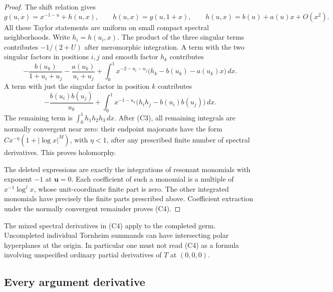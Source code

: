 \begin{proof}
The shift relation gives
\[
 g(u,x)=x^{-1-u}+h(u,x),\qquad h(u,x)=g(u,1+x),
 \qquad h(u,x)=b(u)+a(u)x+O(x^2).
\]
All these Taylor statements are uniform on small compact spectral
neighborhoods.  Write $h_i=h(u_i,x)$.  The product of the three singular
terms contributes $-1/(2+U)$ after meromorphic integration. A term with
the two singular factors in positions $i,j$ and smooth factor $h_k$
contributes
\[
 -\frac{b(u_k)}{1+u_i+u_j}-\frac{a(u_k)}{u_i+u_j}
 +\int_0^1x^{-2-u_i-u_j}
             \bigl(h_k-b(u_k)-a(u_k)x\bigr)\,dx.
\]
A term with just the singular factor in position $k$ contributes
\[
 -\frac{b(u_i)b(u_j)}{u_k}
 +\int_0^1x^{-1-u_k}\bigl(h_i h_j-b(u_i)b(u_j)\bigr)\,dx.
\]
The remaining term is $\int_0^1h_1h_2h_3\,dx$.
After (C3), all remaining integrals are normally convergent near zero:
their endpoint majorants have the form
$Cx^{-\eta}(1+|\log x|^M)$, with $\eta<1$, after any prescribed finite
number of spectral derivatives.  This proves holomorphy.

The deleted expressions are exactly the integrations of resonant
monomials with exponent $-1$ at $\boldsymbol u=0$. Each coefficient of
such a monomial is a multiple of $x^{-1}\log^j x$, whose unit-coordinate
finite part is zero. The other integrated monomials have precisely the
finite parts prescribed above. Coefficient extraction under the
normally convergent remainder proves (C4).
\end{proof}

The mixed spectral derivatives in (C4) apply to the completed germ.
Uncompleted individual Tornheim summands can have intersecting polar
hyperplanes at the origin. In particular one must not read (C4) as a
formula involving unspecified ordinary partial derivatives of
$T$ at $(0,0,0)$.

\subsection{Every argument derivative}

